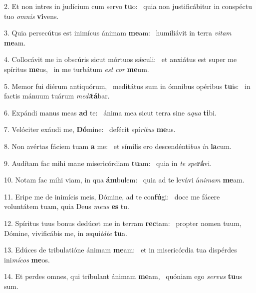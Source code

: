 2. Et non intres in judícium cum servo \textbf{tu}o: \ast\  quia non justificábitur in conspéctu tuo \textit{om}\textit{nis} \textbf{vi}vens.\

3. Quia persecútus est inimícus ánimam \textbf{me}am: \ast\  humiliávit in terra \textit{vi}\textit{tam} \textbf{me}am.\

4. Collocávit me in obscúris sicut mórtuos sǽculi: \dag\  et anxiátus est super me spíritus \textbf{me}us, \ast\  in me turbátum \textit{est} \textit{cor} \textbf{me}um.\

5. Memor fui diérum antiquórum, \dag\  meditátus sum in ómnibus opéribus \textbf{tu}is: \ast\  in factis mánuum tuárum \textit{me}\textit{di}\textbf{tá}bar.\

6. Expándi manus meas \textbf{ad} te: \ast\  ánima mea sicut terra sine \textit{a}\textit{qua} \textbf{ti}bi.\

7. Velóciter exáudi me, \textbf{Dó}mine: \ast\  defécit spí\textit{ri}\textit{tus} \textbf{me}us.\

8. Non avértas fáciem tuam \textbf{a} me: \ast\  et símilis ero descendénti\textit{bus} \textit{in} \textbf{la}cum.\

9. Audítam fac mihi mane misericórdiam \textbf{tu}am: \ast\  quia in \textit{te} \textit{spe}\textbf{rá}vi.\

10. Notam fac mihi viam, in qua \textbf{ám}bulem: \ast\  quia ad te levávi á\textit{ni}\textit{mam} \textbf{me}am.\

11. Eripe me de inimícis meis, Dómine, ad te con\textbf{fú}gi: \ast\  doce me fácere voluntátem tuam, quia Deus \textit{me}\textit{us} \textbf{es} tu.\

12. Spíritus tuus bonus dedúcet me in terram \textbf{rec}tam: \ast\  propter nomen tuum, Dómine, vivificábis me, in æqui\textit{tá}\textit{te} \textbf{tu}a.\

13. Edúces de tribulatióne ánimam \textbf{me}am: \ast\  et in misericórdia tua dispérdes ini\textit{mí}\textit{cos} \textbf{me}os.\

14. Et perdes omnes, qui tríbulant ánimam \textbf{me}am, \ast\  quóniam ego \textit{ser}\textit{vus} \textbf{tu}us sum.\

